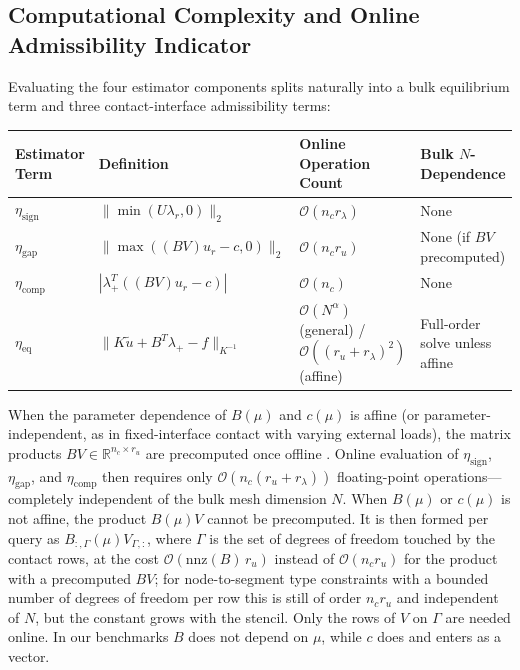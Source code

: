 \documentclass[11pt,a4paper]{article}
\begin{document}
\hypertarget{computational-complexity-and-online-admissibility-indicator}{%
\subsection{Computational Complexity and Online Admissibility Indicator}\label{computational-complexity-and-online-admissibility-indicator}}

Evaluating the four estimator components splits naturally into a bulk equilibrium term and three contact-interface admissibility terms:

\begin{longtable}[]{@{}
  >{\raggedright\arraybackslash}p{}
  >{\raggedright\arraybackslash}p{}
  >{\raggedright\arraybackslash}p{}
  >{\raggedright\arraybackslash}p{}@{}}
\toprule
Estimator Term & Definition & Online Operation Count & Bulk \(N\)-Dependence \\
\midrule
\endhead
\(\eta_{\mathrm{sign}}\) & \(\|\min(U \lambda_r, 0)\|_2\) & \(\mathcal{O}(n_c r_\lambda)\) & None \\
\(\eta_{\mathrm{gap}}\) & \(\|\max((B V) u_r - c, 0)\|_2\) & \(\mathcal{O}(n_c r_u)\) & None (if \(B V\) precomputed) \\
\(\eta_{\mathrm{comp}}\) & \(|\lambda_+^T ((B V) u_r - c)|\) & \(\mathcal{O}(n_c)\) & None \\
\(\eta_{\mathrm{eq}}\) & \(\|K \tilde{u} + B^T \lambda_+ - f\|_{K^{-1}}\) & \(\mathcal{O}(N^\alpha)\) (general) / \(\mathcal{O}((r_u + r_\lambda)^2)\) (affine) & Full-order solve unless affine \\
\bottomrule
\end{longtable}

When the parameter dependence of \(B(\mu)\) and \(c(\mu)\) is affine (or parameter-independent, as in fixed-interface contact with varying external loads), the matrix products \(B V \in \mathbb{R}^{n_c \times r_u}\) are precomputed once offline \cite{benaceur2020reduced, zhang2014duality}. Online evaluation of \(\eta_{\mathrm{sign}}\), \(\eta_{\mathrm{gap}}\), and \(\eta_{\mathrm{comp}}\) then requires only \(\mathcal{O}(n_c (r_u + r_\lambda))\) floating-point operations---completely independent of the bulk mesh dimension \(N\). When \(B(\mu)\) or \(c(\mu)\) is not affine, the product \(B(\mu) V\) cannot be precomputed. It is then formed per query as \(B_{:,\Gamma}(\mu) V_{\Gamma,:}\), where \(\Gamma\) is the set of degrees of freedom touched by the contact rows, at the cost \(\mathcal{O}(\mathrm{nnz}(B)\, r_u)\) instead of \(\mathcal{O}(n_c r_u)\) for the product with a precomputed \(BV\); for node-to-segment type constraints with a bounded number of degrees of freedom per row this is still of order \(n_c r_u\) and independent of \(N\), but the constant grows with the stencil. Only the rows of \(V\) on \(\Gamma\) are needed online. In our benchmarks \(B\) does not depend on \(\mu\), while \(c\) does and enters as a vector.
\end{document}
